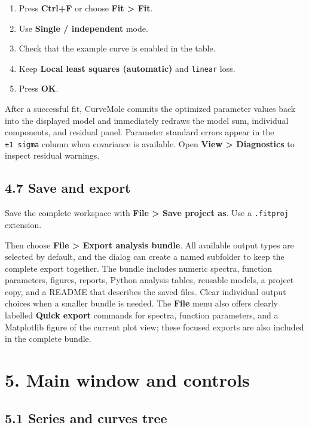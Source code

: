 \documentclass[
  10pt,
  a4paper,
  oneside]{scrreprt}
\providecommand{\tightlist}{%
  \setlength{\itemsep}{0pt}\setlength{\parskip}{0pt}}
\begin{document}
\begin{enumerate}
\def\labelenumi{\arabic{enumi}.}
\tightlist
\item
  Press \textbf{Ctrl+F} or choose \textbf{Fit \textgreater{} Fit}.
\item
  Use \textbf{Single / independent} mode.
\item
  Check that the example curve is enabled in the table.
\item
  Keep \textbf{Local least squares (automatic)} and \texttt{linear}
  loss.
\item
  Press \textbf{OK}.
\end{enumerate}

After a successful fit, CurveMole commits the optimized parameter values
back into the displayed model and immediately redraws the model sum,
individual components, and residual panel. Parameter standard errors
appear in the \texttt{±1\ sigma} column when covariance is available.
Open \textbf{View \textgreater{} Diagnostics} to inspect residual
warnings.

\hypertarget{save-and-export}{%
\section{4.7 Save and export}\label{save-and-export}}

Save the complete workspace with \textbf{File \textgreater{} Save
project as}. Use a \texttt{.fitproj} extension.

Then choose \textbf{File \textgreater{} Export analysis bundle}. All
available output types are selected by default, and the dialog can
create a named subfolder to keep the complete export together. The
bundle includes numeric spectra, function parameters, figures, reports,
Python analysis tables, reusable models, a project copy, and a README
that describes the saved files. Clear individual output choices when a
smaller bundle is needed. The \textbf{File} menu also offers clearly
labelled \textbf{Quick export} commands for spectra, function
parameters, and a Matplotlib figure of the current plot view; these
focused exports are also included in the complete bundle.

\hypertarget{main-window-and-controls}{%
\chapter{5. Main window and controls}\label{main-window-and-controls}}

\hypertarget{series-and-curves-tree}{%
\section{5.1 Series and curves tree}\label{series-and-curves-tree}}
\end{document}
